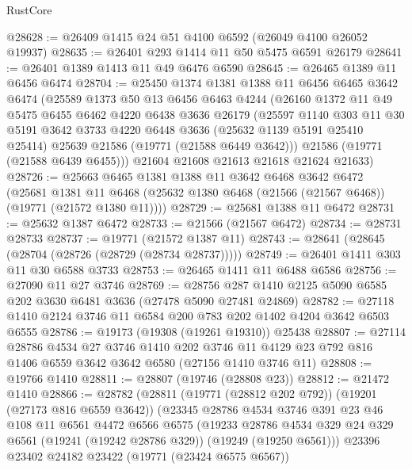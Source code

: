 \begin{lexlean}{RustCore}
\begin{coremodule}
@28628 := @26409 @1415 @24 @51 @4100 @6592 (@26049 @4100 @26052 @19937)
@28635 := @26401 @293 @1414 @11 @50 @5475 @6591 @26179
@28641 := @26401 @1389 @1413 @11 @49 @6476 @6590
@28645 := @26465 @1389 @11 @6456 @6474
@28704 := @25450
    @1374
    @1381
    @1388
    @11
    @6456
    @6465
    @3642
    @6474
    (@25589
      @1373
      @50
      @13
      @6456
      @6463
      @4244
      (@26160
        @1372
        @11
        @49
        @5475
        @6455
        @6462
        @4220
        @6438
        @3636
        @26179
        (@25597
          @1140
          @303
          @11
          @30
          @5191
          @3642
          @3733
          @4220
          @6448
          @3636
          (@25632 @1139 @5191 @25410 @25414)
          @25639
          @21586
          (@19771 (@21588 @6449 @3642)))
        @21586
        (@19771 (@21588 @6439 @6455)))
      @21604
      @21608
      @21613
      @21618
      @21624
      @21633)
@28726 := @25663
    @6465
    @1381
    @1388
    @11
    @3642
    @6468
    @3642
    @6472
    (@25681
      @1381
      @11
      @6468
      (@25632 @1380 @6468 (@21566 (@21567 @6468)) (@19771 (@21572 @1380 @11))))
@28729 := @25681 @1388 @11 @6472
@28731 := @25632 @1387 @6472
@28733 := @21566 (@21567 @6472)
@28734 := @28731 @28733
@28737 := @19771 (@21572 @1387 @11)
@28743 := @28641 (@28645 (@28704 (@28726 (@28729 (@28734 @28737)))))
@28749 := @26401 @1411 @303 @11 @30 @6588 @3733
@28753 := @26465 @1411 @11 @6488 @6586
@28756 := @27090 @11 @27 @3746
@28769 := @28756 @287 @1410 @2125 @5090 @6585 @202 @3630 @6481 @3636 (@27478 @5090 @27481 @24869)
@28782 := @27118 @1410 @2124 @3746 @11 @6584 @200 @783 @202 @1402 @4204 @3642 @6503 @6555
@28786 := @19173 (@19308 (@19261 @19310)) @25438
@28807 := @27114
    @28786
    @4534
    @27
    @3746
    @1410
    @202
    @3746
    @11
    @4129
    @23
    @792
    @816
    @1406
    @6559
    @3642
    @3642
    @6580
    (@27156 @1410 @3746 @11)
@28808 := @19766 @1410
@28811 := @28807 (@19746 (@28808 @23))
@28812 := @21472 @1410
@28866 := @28782
    (@28811
      (@19771 (@28812 @202 @792))
      (@19201 (@27173 @816 @6559 @3642))
      (@23345
        @28786
        @4534
        @3746
        @391
        @23
        @46
        @108
        @11
        @6561
        @4472
        @6566
        @6575
        (@19233
          @28786
          @4534
          @329
          @24
          @329
          @6561
          (@19241 (@19242 @28786 @329))
          (@19249 (@19250 @6561)))
        @23396
        @23402
        @24182
        @23422
        (@19771 (@23424 @6575 @6567))

\end{coremodule}
\end{lexlean}

